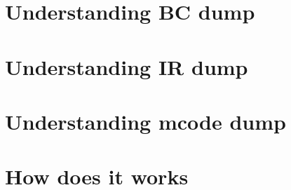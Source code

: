 

\section{Understanding BC dump}
\label{Sec:dump-bc}

\section{Understanding IR dump}
\label{Sec:dump-ir}

\section{Understanding mcode dump}
\label{Sec:dump-mcode}

\section{How does it works}
\label{Sec:dump-internals}

